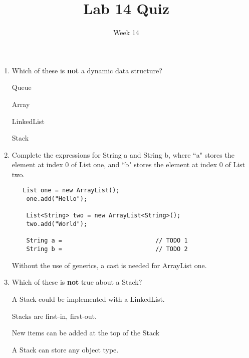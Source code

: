 \documentclass[addpoints]{exam}
\title{Lab 14 Quiz}
\date{Week 14}
\begin{document}
 

\Instructions
\begin{enumerate}
\newline
\item {}
Which of these is \textbf{not} a dynamic data structure?

\begin{oneparchoices} 
\hspace{0.2cm}
 
 \choice Queue \newline
 
 \choice \Ans Array \newline
 
 \choice LinkedList\newline
 
 \choice Stack \newline
 \end{oneparchoices}
 
\item {} Complete the expressions for String a and String b, where ``a" stores the element at index 0 of List one, and ``b" stores the element at index 0 of List two.
\newline
\begin{lstlisting}
   List one = new ArrayList();
	one.add("Hello");
	
	List<String> two = new ArrayList<String>();
	two.add("World");

	String a =                          // TODO 1
	String b =                          // TODO 2

\end{lstlisting}
\Ans Without the use of generics, a cast is needed for ArrayList one.

\item {}
Which of these is \textbf{not} true about a Stack?

\begin{oneparchoices} 
\hspace{0.2cm}
 
 \choice  A Stack could be implemented with a LinkedList. \newline
 
 \choice \Ans Stacks are first-in, first-out. \newline
 
 \choice New items can be added at the top of the Stack \newline
 
 \choice A Stack can store any object type. \newline
 \end{oneparchoices}


\end{enumerate}
\end{document}
